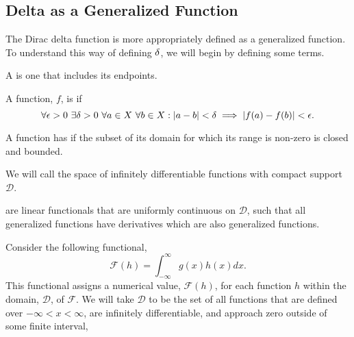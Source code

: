 \subsection{Delta as a Generalized Function}
The Dirac delta function is more appropriately defined as a generalized function. To understand this way of defining \(\delta\), we will begin by defining some terms.

\begin{definition}
     A  is one that includes its endpoints.
\end{definition}

\begin{definition}
    A function, \(f\), is  if 
    \begin{equation}
        \forall \epsilon > 0 ~ \exists \delta > 0 ~ \forall a \in X ~ \forall b \in X: |a-b| < \delta \implies |f(a) - f(b)| < \epsilon.
    \end{equation}
\end{definition}

\begin{definition}
    A function has  if the subset of its domain for which its range is non-zero is closed and bounded.
\end{definition}
We will call the space of infinitely differentiable functions with compact support \(\mathcal{D}\).

\begin{definition}
     are linear functionals that are uniformly continuous on \(\mathcal{D}\), such that all generalized functions have derivatives which are also generalized functions.
\end{definition}

Consider the following functional,
\begin{equation}
    \mathcal{F}(h) = \int_{-\infty}^{\infty} g(x)h(x)dx.
\end{equation}
This functional assigns a numerical value, \(\mathcal{F}(h)\), for each function \(h\) within the domain, \(\mathcal{D}\), of \(\mathcal{F}\). We will take \(\mathcal{D}\) to be the set of all functions that are defined over \(-\infty <x<\infty\), are infinitely differentiable, and approach zero outside of some finite interval,

